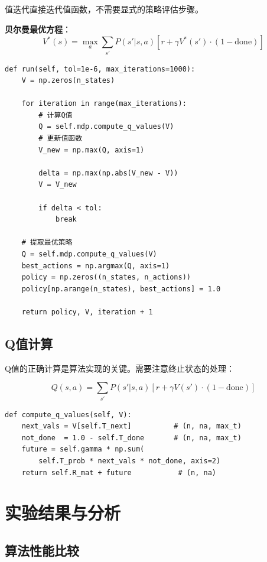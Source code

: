 \documentclass[12pt,a4paper]{article}
\begin{document}
值迭代直接迭代值函数，不需要显式的策略评估步骤。

\textbf{贝尔曼最优方程}：
\begin{equation}
V^*(s) = \max_a \sum_{s'} P(s'|s,a)[r + \gamma V^*(s') \cdot (1-\text{done})]
\end{equation}

\begin{lstlisting}[caption={值迭代算法实现}]
def run(self, tol=1e-6, max_iterations=1000):
    V = np.zeros(n_states)
    
    for iteration in range(max_iterations):
        # 计算Q值
        Q = self.mdp.compute_q_values(V)
        # 更新值函数
        V_new = np.max(Q, axis=1)
        
        delta = np.max(np.abs(V_new - V))
        V = V_new
        
        if delta < tol:
            break
    
    # 提取最优策略
    Q = self.mdp.compute_q_values(V)
    best_actions = np.argmax(Q, axis=1)
    policy = np.zeros((n_states, n_actions))
    policy[np.arange(n_states), best_actions] = 1.0
    
    return policy, V, iteration + 1
\end{lstlisting}

\subsection{Q值计算}

Q值的正确计算是算法实现的关键。需要注意终止状态的处理：

\begin{equation}
Q(s,a) = \sum_{s'} P(s'|s,a)[r + \gamma V(s') \cdot (1-\text{done})]
\end{equation}

\begin{lstlisting}[caption={Q值计算}]
def compute_q_values(self, V):
    next_vals = V[self.T_next]          # (n, na, max_t)
    not_done  = 1.0 - self.T_done       # (n, na, max_t)
    future = self.gamma * np.sum(
        self.T_prob * next_vals * not_done, axis=2)
    return self.R_mat + future           # (n, na)
\end{lstlisting}

\section{实验结果与分析}

\subsection{算法性能比较}
\end{document}
